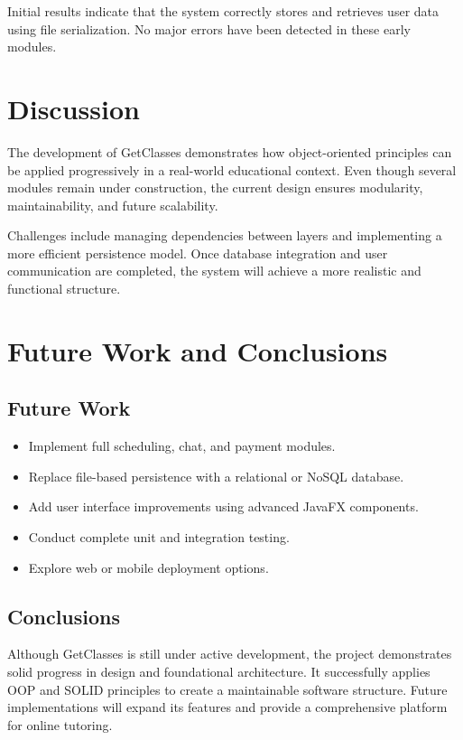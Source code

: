 \documentclass[12pt,a4paper]{report}
\begin{document}
Initial results indicate that the system correctly stores and retrieves user data using file serialization. No major errors have been detected in these early modules.

\chapter{Discussion}
The development of GetClasses demonstrates how object-oriented principles can be applied progressively in a real-world educational context. Even though several modules remain under construction, the current design ensures modularity, maintainability, and future scalability.


Challenges include managing dependencies between layers and implementing a more efficient persistence model. Once database integration and user communication are completed, the system will achieve a more realistic and functional structure.

\chapter{Future Work and Conclusions}
\section{Future Work}
\begin{itemize}
    \item Implement full scheduling, chat, and payment modules.
    \item Replace file-based persistence with a relational or NoSQL database.
    \item Add user interface improvements using advanced JavaFX components.
    \item Conduct complete unit and integration testing.
    \item Explore web or mobile deployment options.
\end{itemize}


\section{Conclusions}
Although GetClasses is still under active development, the project demonstrates solid progress in design and foundational architecture. It successfully applies OOP and SOLID principles to create a maintainable software structure. Future implementations will expand its features and provide a comprehensive platform for online tutoring.
\end{document}
